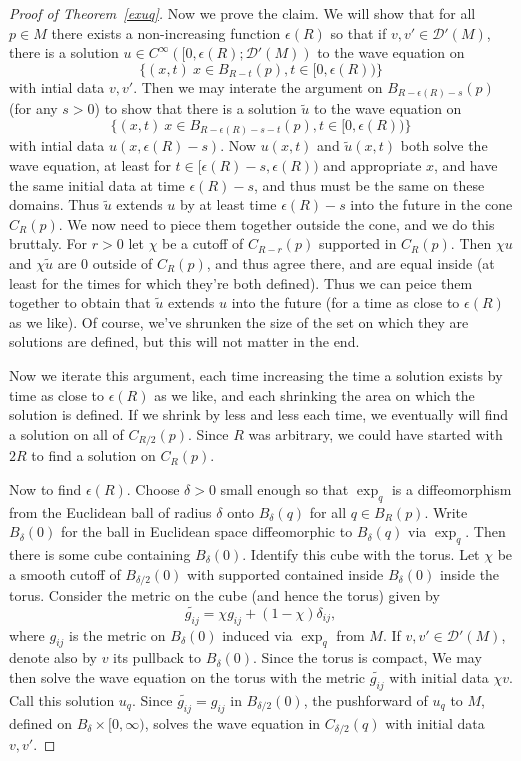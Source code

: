 \documentclass[12pt]{article}
\begin{document}
\begin{proof}[Proof of Theorem~\ref{exuq}]
Now we prove the claim. We will show that for all $p \in M$ there exists a non-increasing function $\epsilon(R)$ so that if $v,v' \in \mathcal D'(M)$, there is a solution $u \in C^\infty([0,\epsilon(R);\mathcal D'(M))$ to the wave equation on \[\{(x,t)\: x \in B_{R-t}(p), t \in [0,\epsilon(R))\}\] with intial data $v,v'$. Then we may interate the argument on $B_{R-\epsilon(R)-s}(p)$ (for any $s > 0$) to show that there is a solution $\tilde{u}$ to the wave equation on
\[\{(x,t)\: x \in B_{R-\epsilon(R)-s-t}(p), t \in [0,\epsilon(R))\}\] with intial data $u(x,\epsilon(R)-s)$. Now $u(x,t)$ and $\tilde{u}(x,t)$ both solve the wave equation, 
at least for $t \in [\epsilon(R)-s,\epsilon(R))$ and appropriate $x$, and have the same initial data at time $\epsilon(R)-s$, and thus must be the same on these domains. Thus $\tilde{u}$ extends $u$ by at least time $\epsilon(R)-s$ into the future in the cone $C_R(p)$. We now need to piece them together outside the cone, and we do this bruttaly. For $r > 0$ let $\chi$ be a cutoff of $C_{R-r}(p)$ supported in $C_{R}(p)$. Then $\chi u$ and $\chi \tilde{u}$ are $0$ outside of $C_{R}(p)$, and thus agree there, and are equal inside (at least for the times for which they're both defined). Thus we can peice them together to obtain that $\tilde{u}$ extends $u$ into the future (for a time as close to $\epsilon(R)$ as we like). Of course, we've shrunken the size of the set on which they are solutions are defined, but this will not matter in the end. 

Now we iterate this argument, each time increasing the time a solution exists by time as close to $\epsilon(R)$ as we like, and each shrinking the area on which the solution is defined. If we shrink by less and less each time, we eventually will find a solution on all of $C_{R/2}(p)$. Since $R$ was arbitrary, we could have started with $2R$ to find a solution on $C_{R}(p)$.

Now to find $\epsilon(R)$. Choose $\delta > 0$ small enough so that $\exp_q$ is a diffeomorphism from the Euclidean ball of radius $\delta$ onto $B_\delta(q)$ for all $q \in B_R(p)$. Write $B_\delta(0)$ for the ball in Euclidean space diffeomorphic to $B_\delta(q)$ via $\exp_q$. Then there is some cube containing $B_\delta(0)$. Identify this cube with the torus. Let $\chi$ be a smooth cutoff of $B_{\delta/2}(0)$ with supported contained inside $B_{\delta}(0)$ inside the torus. Consider the metric on the cube (and hence the torus) given by
\[\tilde{g_{ij}} = \chi g_{ij} + (1-\chi)\delta_{ij},\] where $g_{ij}$ is the metric on $B_\delta(0)$ induced via $\exp_q$ from $M$. If $v,v' \in \mathcal D'(M)$, denote also by $v$ its pullback to $B_{\delta}(0)$. Since the torus is compact, We may then solve the wave equation on the torus with the metric $\tilde{g_{ij}}$ with initial data $\chi v$. Call this solution $u_q$. Since $\tilde{g_{ij}} = g_{ij}$ in $B_{\delta/2}(0)$, the pushforward of $u_q$ to $M$, defined on $B_{\delta}\times[0,\infty)$, solves the wave equation in $C_{\delta/2}(q)$ with initial data $v,v'$.


\end{proof}
\end{document}
